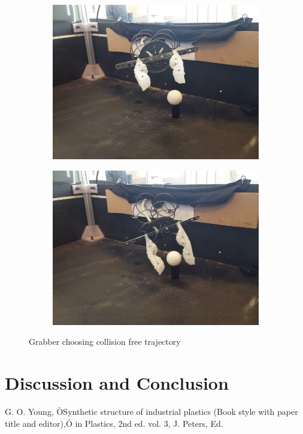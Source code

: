 \documentclass[letterpaper, 10 pt, conference]{ieeeconf}  %
\begin{document}
\begin{figure}[htpb]
\begin{subfigure}[b]{0.72in}
                \includegraphics[width=\textwidth]{figures/path/g3.png}
        \end{subfigure}
        \begin{subfigure}[b]{0.72in}                            
                \centering
                \includegraphics[width=\textwidth]{figures/path/g4.png}
        \end{subfigure}
        \caption{Grabber choosing collision free trajectory}
        \label{fig:grabberpath}
\end{figure}
\blindtext[4]
\section{Discussion and Conclusion}
\blindtext[4]

\addtolength{\textheight}{-12cm}   


\begin{thebibliography}{99}

 G. O. Young, ÒSynthetic structure of industrial plastics (Book style with paper title and editor),Ó 	in Plastics, 2nd ed. vol. 3, J. Peters, Ed.  


\end{thebibliography}
\end{document}
